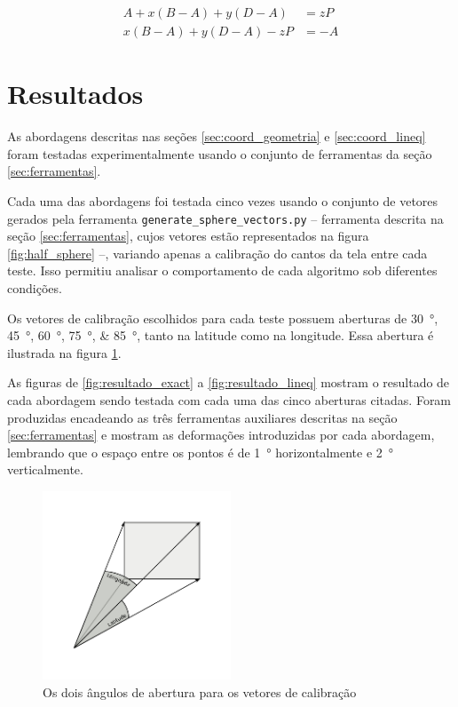 \documentclass[brazil,pagestart=firstchapter]{abnt}
\begin{document}
\begin{align}
\label{eq:lineq_inicial}
A + x (B-A) + y (D-A) & = z P  \\
\label{eq:lineq_vetorial}
x (B-A) + y (D-A) - z P & = -A
\end{align}



\section{Resultados}
\label{sec:coord_resultados}

As abordagens descritas nas seções \ref{sec:coord_geometria} e
\ref{sec:coord_lineq} foram testadas experimentalmente usando o conjunto de
ferramentas da seção \ref{sec:ferramentas}.

Cada uma das abordagens foi testada cinco vezes usando o conjunto de vetores
gerados pela ferramenta \texttt{generate\_sphere\_vectors.py} -- ferramenta
descrita na seção \ref{sec:ferramentas}, cujos vetores estão representados
na figura \ref{fig:half_sphere} --, variando apenas a calibração do cantos
da tela entre cada teste. Isso permitiu analisar o comportamento de cada
algoritmo sob diferentes condições.

Os vetores de calibração escolhidos para cada teste possuem aberturas de
\SIlist{30;45;60;75;85}{\degree}, tanto na latitude como na longitude. Essa
abertura é ilustrada na figura \ref{fig:latitude_longitude}.

As figuras de \ref{fig:resultado_exact} a \ref{fig:resultado_lineq} mostram
o resultado de cada abordagem sendo testada com cada uma das cinco aberturas
citadas. Foram produzidas encadeando as três ferramentas auxiliares
descritas na seção \ref{sec:ferramentas} e mostram as deformações
introduzidas por cada abordagem, lembrando que o espaço entre os pontos é de
\SI{1}{\degree} horizontalmente e \SI{2}{\degree} verticalmente.

\begin{figure}[h]
\centering
\includegraphics[width=0.5\textwidth]{img/latitude_longitude.pdf}
\caption{Os dois ângulos de abertura para os vetores de calibração}
\label{fig:latitude_longitude}
\end{figure}
\end{document}
